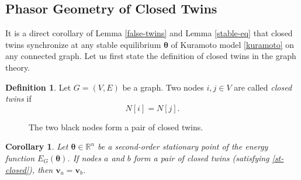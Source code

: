 \documentclass[11pt,reqno]{amsart}
\newtheorem{corollary}[theorem]{Corollary}
\theoremstyle{definition}
\newtheorem{definition}[theorem]{Definition}
\begin{document}
\subsection{Phasor Geometry of Closed Twins}\label{sec:closed-twins}
It is a direct corollary of Lemma \ref{false-twins} and Lemma \ref{stable-eq} that closed twins synchronize at any stable equilibrium $\boldsymbol{\theta}$ of Kuramoto model \ref{kuramoto} on any connected graph. Let us first state the definition of closed twins in the graph theory.
\begin{definition}Let $G=(V,E)$ be a graph. 
Two nodes $i,j \in V$ are called 
\emph{closed twins} if
\begin{equation}\label{st-closed}
N[i] = N[j].\end{equation}
\end{definition}

\begin{figure}[H]
\centering
{}


\newcommand{\BottomRow}{
  \foreach \x in {-2,-1,0,1,2}{
    \node[bot] (b\x) at (\x,0) {};
    \draw[stub] (b\x) -- ++(-0.2,-0.3);
    \draw[stub] (b\x) -- ++( 0.2,-0.3);
  }
}
\newcommand{\ConnectAll}[1]{ 
  \foreach \x in {-2,-1,0,1,2}{ \draw[edge] (#1) -- (b\x); }
}

\begin{subfigure}[b]{0.45\textwidth}  
\centering
{}
\end{subfigure}

\caption{The two black nodes form a pair of closed twins.}
\label{fig:twin-two-panels}
\end{figure}

\begin{corollary}\label{cor:twins-sync}
Let $\boldsymbol{\theta}\in\mathbb R^n$ be a second-order stationary point of the energy function $E_G(\boldsymbol{\theta})$. 
If nodes $a$ and $b$ form a pair of closed twins (satisfying \eqref{st-closed}), then $\boldsymbol{v}_a = \boldsymbol{v}_b$.
\end{corollary}
\end{document}
